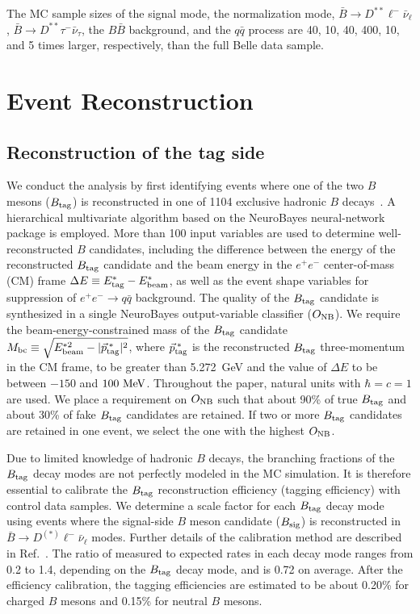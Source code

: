 \documentclass[aps,prd,twocolumn,superscriptaddress,showpacs,preprintnumbers,amsmath,amssymb]{revtex4-1}
\begin{document}
The MC sample sizes of the signal mode, the normalization mode, ${\bar B} \rightarrow D^{**} \ell^- \bar{\nu}_\ell$, ${\bar B} \rightarrow D^{**} \tau^- \bar{\nu}_\tau$, the $B \bar{B}$ background, and the $q \bar{q}$ process are 40, 10, 40, 400, 10, and 5 times larger, respectively, than the full Belle data sample.

\section{Event Reconstruction}

\subsection{Reconstruction of the tag side}\label{sec:recon-tagside}

We conduct the analysis by first identifying events where one of the two $B$ mesons ($B_{\rm tag}$) is reconstructed in one of 1104 exclusive hadronic $B$ decays~\cite{cite:Full-recon:2011}. A hierarchical multivariate algorithm based on the NeuroBayes neural-network package is employed. More than 100 input variables are used to determine well-reconstructed $B$ candidates, including the difference between the energy of the reconstructed $B_{\rm tag}$ candidate and the beam energy in the $e^+ e^-$ center-of-mass (CM) frame $\Delta E \equiv E_{\rm tag}^* - E_{\rm beam}^*$, as well as the event shape variables for suppression of $e^+ e^- \rightarrow q{\bar q}$ background. The quality of the $B_{\rm tag}$ candidate is synthesized in a single NeuroBayes output-variable classifier ($O_{\rm NB}$). We require the beam-energy-constrained mass of the $B_{\rm tag}$ candidate $M_{\rm bc} \equiv \sqrt{ E_{\rm beam}^{*2} - |\vec{p}_{\rm tag}^{\kern2pt *}|^2}$, where $\vec{p}_{\rm tag}^{\kern2pt *}$ is the reconstructed $B_{\rm tag}$ three-momentum in the CM frame, to be greater than 5.272~GeV and the value of $\Delta E$ to be between $-150$ and $100~{\rm MeV}$. Throughout the paper, natural units with $\hbar = c = 1$ are used. We place a requirement on $O_{\rm NB}$ such that about 90\% of true $B_{\rm tag}$ and about 30\% of fake $B_{\rm tag}$ candidates are retained. If two or more $B_{\rm tag}$ candidates are retained in one event, we select the one with the highest $O_{\rm NB}$.

Due to limited knowledge of hadronic $B$ decays, the branching fractions of the $B_{\rm tag}$ decay modes are not perfectly modeled in the MC simulation. It is therefore essential to calibrate the $B_{\rm tag}$ reconstruction efficiency (tagging efficiency) with control data samples. We determine a scale factor for each $B_{\rm tag}$ decay mode using events where the signal-side $B$ meson candidate ($B_{\rm sig}$) is reconstructed in $\bar{B} \rightarrow D^{(*)} \ell^- \bar{\nu}_\ell$ modes. Further details of the calibration method are described in Ref.~\cite{cite:Belle_Xulnu:2013}. The ratio of measured to expected rates in each decay mode ranges from 0.2 to 1.4, depending on the $B_{\rm tag}$ decay mode, and is 0.72 on average. After the efficiency calibration, the tagging efficiencies are estimated to be about 0.20\% for charged $B$ mesons and 0.15\% for neutral $B$ mesons.
\end{document}
